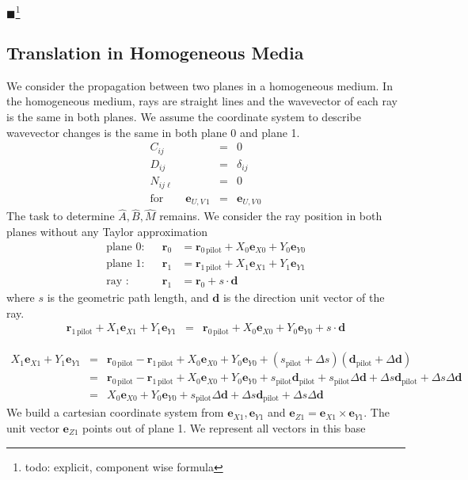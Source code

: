 \documentclass[12pt,a4paper,twoside,openright,BCOR10mm,headsepline,titlepage,abstracton,chapterprefix,final]{scrreprt}
\newcommand\Vector[1]{{\mathbf{#1}}}
\newcommand\Location{\Vector{r}}
\newcommand{\remark}[1]{{\color{red}$\blacksquare$}\footnote{{\color{red}#1}}}
\newcommand\pilot{\textrm{pilot}}
\begin{document}
\remark{todo: explicit, component wise formula}

\subsection{Translation in Homogeneous Media}
We consider the propagation between two planes in a homogeneous medium.
In the homogeneous medium, rays are straight lines and the wavevector of each ray is the same in both planes.
We assume the coordinate system to describe wavevector changes is the same in both plane 0 and plane 1.
\begin{eqnarray}
C_{ij} &=& 0 \\
D_{ij} &=& \delta_{ij} \\
N_{ij\ell} &=& 0 \\
\text{for}\qquad \Vector{e}_{U,V\,1} &=& \Vector{e}_{U,V\,0} \nonumber
\end{eqnarray}
The task to determine $\hat{A},\hat{B}, \hat{M}$ remains. 
We consider the ray position in both planes without any Taylor approximation
\begin{align}
 \text{plane 0:} && \Location_0 &= \Location_{0\,\pilot} + X_0 \Vector{e}_{X0} + Y_0 \Vector{e}_{Y0} \\
 \text{plane 1:} && \Location_1 &= \Location_{1\,\pilot} + X_1 \Vector{e}_{X1} + Y_1 \Vector{e}_{Y1} \\
 \text{ray :} && \Location_1 &= \Location_{0} + s \cdot \Vector{d}
\end{align}
where $s$ is the geometric path length, and $\Vector{d}$ is the direction unit vector of the ray.
\begin{eqnarray}
\Location_{1\,\pilot} + X_1 \Vector{e}_{X1} + Y_1 \Vector{e}_{Y1} &=& \Location_{0\,\pilot} + X_0 \Vector{e}_{X0} + Y_0 \Vector{e}_{Y0}  + s \cdot \Vector{d}
\end{eqnarray}

\begin{eqnarray}
  X_1 \Vector{e}_{X1} + Y_1 \Vector{e}_{Y1} 
  &=& 
  \Location_{0\,\pilot} - \Location_{1\,\pilot} + X_0 \Vector{e}_{X0} + Y_0 \Vector{e}_{Y0}  + (s_{\pilot} + \Delta s) ( \Vector{d}_{\pilot} + \Delta \Vector{d} )
\\
  &=& 
  \Location_{0\,\pilot} - \Location_{1\,\pilot} + X_0 \Vector{e}_{X0} + Y_0 \Vector{e}_{Y0}  
  + s_{\pilot} \Vector{d}_{\pilot} 
  + s_{\pilot} \Delta \Vector{d} 
  + \Delta s \Vector{d}_{\pilot}
  + \Delta s \Delta \Vector{d}
\\
  &=& 
  X_0 \Vector{e}_{X0} + Y_0 \Vector{e}_{Y0}  
  + s_{\pilot} \Delta \Vector{d} 
  + \Delta s \Vector{d}_{\pilot}
  + \Delta s \Delta \Vector{d}
\end{eqnarray}
We build a cartesian coordinate system from $\Vector{e}_{X1}, \Vector{e}_{Y1}$ and $\Vector{e}_{Z1} = \Vector{e}_{X1} \times \Vector{e}_{Y1}$.
The unit vector $\Vector{e}_{Z1}$ points out of plane 1. We represent all vectors in this base
\end{document}
